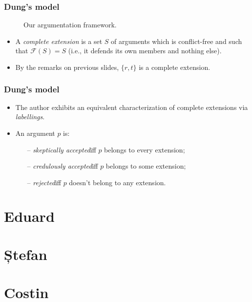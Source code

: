\documentclass{beamer}
\begin{document}
\begin{frame}
\frametitle{Dung's model}
\begin{figure}
\centering
{}
\caption{Our argumentation framework.} \label{af}
\end{figure}
\begin{itemize}
\item A \emph{complete extension} is a set $S$ of arguments which is conflict-free and such that \( \mathcal{F}(S) = S \) (i.e., it defends its own members and nothing else). \pause
\item By the remarks on previous slides, $\{ r, t \}$ is a complete extension.
\end{itemize}
\end{frame}

\begin{frame}
\frametitle{Dung's model}
\begin{itemize}
\item The author exhibits an equivalent characterization of complete extensions via \emph{labellings}. \pause
\item An argument $p$ is:
  \begin{itemize}
  \item[--] \emph{skeptically accepted}\quad iff $p$ belongs to every extension;
  \item[--] \emph{credulously accepted}\quad iff $p$ belongs to some extension;
  \item[--] \emph{rejected}\quad iff $p$ doesn't belong to any extension. 
  \end{itemize}
\end{itemize}
\end{frame}


\section{Eduard}
\section{Ștefan}
\section{Costin}
\end{document}
